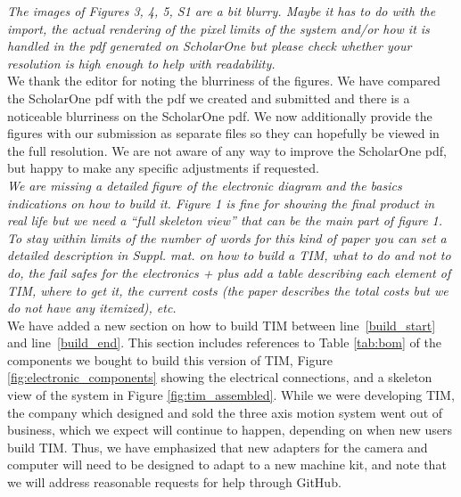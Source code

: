 \documentclass[12pt,a4paper]{article}
\newcommand{\lr}[1]{line~\ref{#1}}
\begin{document}
\emph{The images of Figures 3, 4, 5, S1 are a bit blurry. Maybe it has to do with the import, the actual rendering of the pixel limits of the system and/or how it is handled in the pdf generated on ScholarOne but please check whether your resolution is high enough to help with readability.} \\

We thank the editor for noting the blurriness of the figures. We have compared the ScholarOne pdf with the pdf we created and submitted and there is a noticeable blurriness on the ScholarOne pdf. We now additionally provide the figures with our submission as separate files so they can hopefully be viewed in the full resolution. We are not aware of any way to improve the ScholarOne pdf, but happy to make any specific adjustments if requested. \\ %

\emph{We are missing a detailed figure of the electronic diagram and the basics indications on how to build it. Figure 1 is fine for showing the final product in real life but we need a “full skeleton view” that can be the main part of figure 1. To stay within limits of the number of words for this kind of paper you can set a detailed description in Suppl. mat. on how to build a TIM, what to do and not to do, the fail safes for the electronics + plus add a table describing each element of TIM, where to get it, the current costs (the paper describes the total costs but we do not have any itemized), etc.} \\


We have added a new section on how to build TIM between \lr{build_start} and \lr{build_end}. This section includes references to Table \ref{tab:bom} of the components we bought to build this version of TIM, Figure \ref{fig:electronic_components} showing the electrical connections, and a skeleton view of the system in Figure \ref{fig:tim_assembled}. While we were developing TIM, the company which designed and sold the three axis motion system went out of business, which we expect will continue to happen, depending on when new users build TIM. Thus, we have emphasized that new adapters for the camera and computer will need to be designed to adapt to a new machine kit, and note that we will address reasonable requests for help through GitHub.  \\ %
\end{document}
